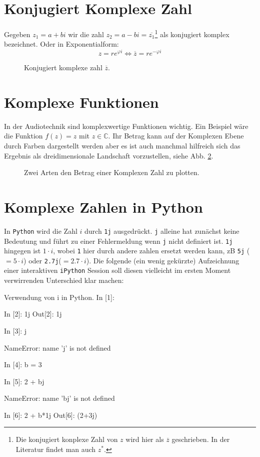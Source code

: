 \section{Konjugiert Komplexe Zahl}
Gegeben $z_1 = a + bi$ wir die zahl $z_2 = a - bi = \overline{z_1}$\footnote{Die konjugiert konplexe Zahl von $z$ wird hier als $\overline{z}$ geschrieben. In der Literatur findet man auch $z^{*}$.} als konjugiert komplex bezeichnet. Oder in Exponentialform:
$$z = re^{\varphi i} \iff \overline{z} = re^{-\varphi i}$$

\begin{figure}[h]
	\centering
	
	\caption{Konjugiert komplexe zahl $\overline{z}$.}
	\label{fig:komp_conju}
\end{figure}


\section{Komplexe Funktionen}
In der Audiotechnik sind komplexwertige Funktionen wichtig. Ein Beispiel wäre die Funktion $f(z) = z$ mit $z \in \mathbb{C}$. Ihr Betrag kann auf der Komplexen Ebene durch Farben dargestellt werden aber es ist auch manchmal hilfreich sich das Ergebnis als dreidimensionale Landschaft vorzustellen, siehe Abb. \ref{fig:komp_3D}. 

\begin{figure}[h]
	\centering
	
	\caption{Zwei Arten den Betrag einer Komplexen Zahl zu plotten.}
	\label{fig:komp_3D}
\end{figure}



\section{Komplexe Zahlen in Python}

In \texttt{Python} wird die Zahl $i$ durch \texttt{1j} ausgedrückt. \texttt{j} alleine hat zunächst keine Bedeutung und führt zu einer Fehlermeldung wenn \texttt{j} nicht definiert ist. \texttt{1j} hingegen ist $1\cdot i$, wobei \texttt{1} hier durch andere zahlen ersetzt werden kann, zB \texttt{5j} ($=5\cdot i$) oder \texttt{2.7j}($=2.7 \cdot i$). Die folgende (ein wenig gekürzte) Aufzeichnung einer interaktiven \texttt{iPython} Session soll diesen vielleicht im ersten Moment verwirrenden Unterschied klar machen:

\begin{python}{Verwendung von i in Python.}
In [1]: %

In [2]: 1j
Out[2]: 1j

In [3]: j

NameError: name 'j' is not defined

In [4]: b = 3

In [5]: 2 + bj

NameError: name 'bj' is not defined

In [6]: 2 + b*1j
Out[6]: (2+3j)
\end{python}



